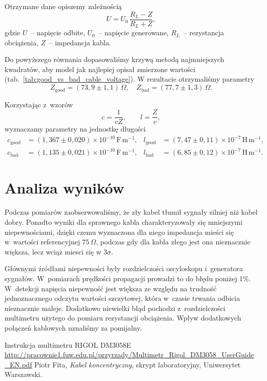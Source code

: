 \documentclass[12pt]{article}
\begin{document}
Otrzymane dane opiszemy zależnością \cite{skrypt}
\[
  U = U_0\,\frac{R_L - Z}{R_L + Z},
\]
\noindent gdzie $U$~-- napięcie odbite, $U_0$~-- napięcie generowane, $R_L$~-- rezystancja obciążenia, $Z$~-- impedancja kabla. 

Do powyższego równania dopasowaliśmy krzywą metodą najmniejszych kwadratów, aby model jak najlepiej opisał zmierzone wartości (tab.~\ref{tab:good_vs_bad_cable_voltage}). W rezultacie otrzymaliśmy parametry
\[
  Z_{\mathrm{good}}=(73{,}9\pm1{,}1)\,\Omega,\quad
  Z_{\mathrm{bad}}=(77{,}7\pm1{,}3)\,\Omega.
\]

Korzystając z~wzorów \cite{skrypt}
\[
  c=\frac{1}{v Z},\qquad l=\frac{Z}{v},
\]
wyznaczamy parametry na jednostkę długości
\begin{align*}
  c_{\mathrm{good}} &= (1{,}367\pm0{,}020)\times10^{-10}\,\mathrm{F\,m^{-1}}, &
  l_{\mathrm{good}} &= (7{,}47\pm0{,}11)\times10^{-7}\,\mathrm{H\,m^{-1}},\\
  c_{\mathrm{bad}}  &= (1{,}135\pm0{,}021)\times10^{-10}\,\mathrm{F\,m^{-1}}, &
  l_{\mathrm{bad}}  &= (6{,}85\pm0{,}12)\times10^{-7}\,\mathrm{H\,m^{-1}}.
\end{align*}

\section{Analiza wyników}
Podczas pomiarów zaobserwowaliśmy, że zły kabel tłumił sygnały silniej niż kabel dobry. Ponadto wyniki dla sprawnego kabla charakteryzowały się mniejszymi niepewnościami, dzięki czemu wyznaczona dla niego impedancja mieści się w~wartości referencyjnej \(75\,\Omega\), podczas gdy dla kabla złego jest ona nieznacznie większa, lecz wciąż miesci się w \(3 \sigma\).

Głównymi źródłami niepewności były rozdzielczości oscyloskopu i~generatora sygnałów. W~pomiarach prędkości propagacji prowadzi to do błędu poniżej \(1\%\). W~detekcji napięcia niepewność jest większa ze względu na trudność jednoznacznego odczytu wartości szczytowej, która w~czasie trwania odbicia nieznacznie maleje. Dodatkowo niewielki błąd pochodzi z~rozdzielczości multimetru użytego do pomiaru rezystancji obciążenia. Wpływ dodatkowych połączeń kablowych uznaliśmy za pomijalny.

\vspace{1 in}

\begin{thebibliography}{2}

Instrukcja multimetru RIGOL DM3058E \url{http://pracownie1.fuw.edu.pl/przyrzady/Multimetr_Rigol_DM3058_UserGuide_EN.pdf}
Piotr Fita, \emph{Kabel koncentryczny}, skrypt laboratoryjny, Uniwersytet Warszawski.

\end{thebibliography}
\end{document}
